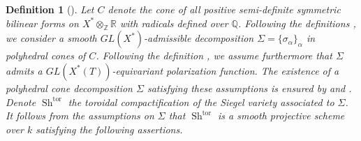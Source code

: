 \documentclass[11pt]{amsart}
\numberwithin{subsection}{section}
\numberwithin{figure}{section}
\numberwithin{table}{section}
\theoremstyle{1}
\newtheorem{definition}[theorem]{Definition}
\theoremstyle{2}
\DeclareMathOperator{\Sh}{Sh}
\DeclareMathOperator{\tor}{tor}
\begin{document}
\begin{definition}[{\cite[Chapter 4]{MR1083353}\cite[Th. 2.15]{MR2968629}}]\label{prop5_sieg}
Let $C$ denote the cone of all positive semi-definite symmetric bilinear forms on $X^* \otimes_{\mathbb{Z}} \mathbb{R}$ with radicals defined over $\mathbb{Q}$. Following the definitions \cite[Chapter 4, Definition 2.2/2.3]{MR1083353}, we consider a smooth $GL(X^*)$-admissible decomposition $\Sigma = \{ \sigma_{\alpha} \}_{\alpha}$ in polyhedral cones of $C$. Following the definition \cite[Chapter 4, Definition 2.4]{MR1083353}, we assume furthermore that $\Sigma$ admits a $GL(X^*(T))$-equivariant polarization function. The existence of a polyhedral cone decomposition $\Sigma$ satisfying these assumptions is ensured by  \cite{MR2590897} and \cite{MR0335518}. Denote $\Sh^{\tor}$ the toroidal compactification of the Siegel variety associated to $\Sigma$. It follows from the assumptions on $\Sigma$ that $\Sh^{\tor}$ is a smooth projective scheme over $k$ satisfying the following assertions.


\end{definition}
\end{document}
